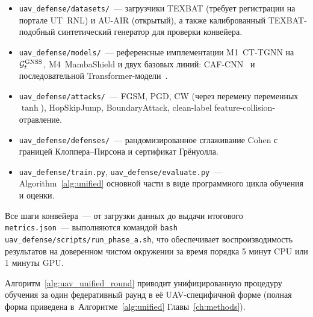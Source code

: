 \begin{itemize}\setlength\itemsep{0.1em}
\item \texttt{uav\_defense/datasets/}~--- загрузчики TEXBAT (требует
регистрации на портале UT~RNL) и AU-AIR (открытый), а также калиброванный
TEXBAT-подобный синтетический генератор для проверки конвейера.
\item \texttt{uav\_defense/models/}~--- референсные имплементации
\textsf{M1~CT-TGNN} на $\mathcal{G}_t^{\text{GNSS}}$, \textsf{M4~MambaShield}
и двух базовых линий: CAF-CNN~\cite{borhani_2024_uav} и
последовательной Transformer-модели~\cite{aigner_2025_uav}.
\item \texttt{uav\_defense/attacks/}~--- FGSM, PGD, CW
(через перемену переменных $\tanh$), HopSkipJump, BoundaryAttack,
clean-label feature-collision-отравление.
\item \texttt{uav\_defense/defenses/}~--- рандомизированное сглаживание
Cohen с границей Клоппера--Пирсона и сертификат Грёнуолла.
\item \texttt{uav\_defense/train.py},
\texttt{uav\_defense/evaluate.py}~--- Algorithm~\ref{alg:unified}
основной части в виде программного цикла обучения и оценки.
\end{itemize}

Все шаги конвейера~--- от загрузки данных до выдачи итогового
\texttt{metrics.json}~--- выполняются командой
\texttt{bash uav\_defense/scripts/run\_phase\_a.sh}, что обеспечивает
воспроизводимость результатов на доверенном чистом окружении за время
порядка 5 минут CPU или 1 минуты GPU.

Алгоритм~\ref{alg:uav_unified_round} приводит унифицированную процедуру
обучения за один федеративный раунд в её UAV-специфичной форме (полная
форма приведена в~Алгоритме~\ref{alg:unified} Главы~\ref{ch:methods}).

